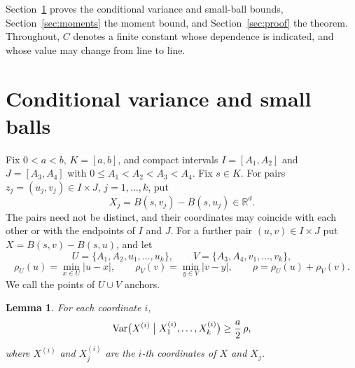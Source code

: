\documentclass[11pt]{amsart}
\newtheorem{lemma}[theorem]{Lemma}
\theoremstyle{remark}
\newcommand{\R}{\mathbb{R}}
\newcommand{\Var}{\operatorname{Var}}
\begin{document}
Section~\ref{sec:var} proves the conditional variance and small-ball bounds, Section~\ref{sec:moments} the moment bound,
and Section~\ref{sec:proof} the theorem. Throughout, $C$ denotes a finite constant whose dependence is indicated, and
whose value may change from line to line.

\section{Conditional variance and small balls}\label{sec:var}

Fix $0<a<b$, $K=[a,b]$, and compact intervals $I=[A_1,A_2]$ and $J=[A_3,A_4]$ with $0\le A_1<A_2<A_3<A_4$. Fix $s\in K$.
For pairs $z_j=(u_j,v_j)\in I\times J$, $j=1,\dots,k$, put
\[
X_j=B(s,v_j)-B(s,u_j)\in\R^d.
\]
The pairs need not be distinct, and their coordinates may coincide with each other or with the endpoints of $I$ and
$J$. For a further pair $(u,v)\in I\times J$ put $X=B(s,v)-B(s,u)$, and let
\[
U=\{A_1,A_2,u_1,\dots,u_k\},\qquad V=\{A_3,A_4,v_1,\dots,v_k\},
\]
\[
\rho_U(u)=\min_{x\in U}|u-x|,\qquad \rho_V(v)=\min_{y\in V}|v-y|,\qquad \rho=\rho_U(u)+\rho_V(v).
\]
We call the points of $U\cup V$ anchors.

\begin{lemma}\label{lem:var}
For each coordinate $i$,
\begin{equation}\label{eq:var}
\Var\bigl(X^{(i)}\bigm| X^{(i)}_1,\dots,X^{(i)}_k\bigr)\ge\frac a2\,\rho,
\end{equation}
where $X^{(i)}$ and $X^{(i)}_j$ are the $i$-th coordinates of $X$ and $X_j$.
\end{lemma}
\end{document}
